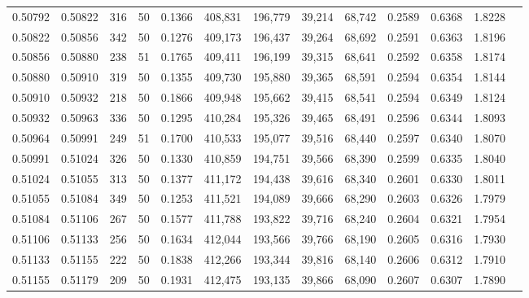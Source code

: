\begin{tabular}{rrrrrrrrrrrrr}
0.50792 & 0.50822 &   316 &  50 &                                     0.1366 & 408,831 & 196,779 &  39,214 &  68,742 & 0.2589 & 0.6368 & 1.8228 \\
0.50822 & 0.50856 &   342 &  50 &                                     0.1276 & 409,173 & 196,437 &  39,264 &  68,692 & 0.2591 & 0.6363 & 1.8196 \\
0.50856 & 0.50880 &   238 &  51 &                                     0.1765 & 409,411 & 196,199 &  39,315 &  68,641 & 0.2592 & 0.6358 & 1.8174 \\
0.50880 & 0.50910 &   319 &  50 &                                     0.1355 & 409,730 & 195,880 &  39,365 &  68,591 & 0.2594 & 0.6354 & 1.8144 \\
0.50910 & 0.50932 &   218 &  50 &                                     0.1866 & 409,948 & 195,662 &  39,415 &  68,541 & 0.2594 & 0.6349 & 1.8124 \\
0.50932 & 0.50963 &   336 &  50 &                                     0.1295 & 410,284 & 195,326 &  39,465 &  68,491 & 0.2596 & 0.6344 & 1.8093 \\
0.50964 & 0.50991 &   249 &  51 &                                     0.1700 & 410,533 & 195,077 &  39,516 &  68,440 & 0.2597 & 0.6340 & 1.8070 \\
0.50991 & 0.51024 &   326 &  50 &                                     0.1330 & 410,859 & 194,751 &  39,566 &  68,390 & 0.2599 & 0.6335 & 1.8040 \\
0.51024 & 0.51055 &   313 &  50 &                                     0.1377 & 411,172 & 194,438 &  39,616 &  68,340 & 0.2601 & 0.6330 & 1.8011 \\
0.51055 & 0.51084 &   349 &  50 &                                     0.1253 & 411,521 & 194,089 &  39,666 &  68,290 & 0.2603 & 0.6326 & 1.7979 \\
0.51084 & 0.51106 &   267 &  50 &                                     0.1577 & 411,788 & 193,822 &  39,716 &  68,240 & 0.2604 & 0.6321 & 1.7954 \\
0.51106 & 0.51133 &   256 &  50 &                                     0.1634 & 412,044 & 193,566 &  39,766 &  68,190 & 0.2605 & 0.6316 & 1.7930 \\
0.51133 & 0.51155 &   222 &  50 &                                     0.1838 & 412,266 & 193,344 &  39,816 &  68,140 & 0.2606 & 0.6312 & 1.7910 \\
0.51155 & 0.51179 &   209 &  50 &                                     0.1931 & 412,475 & 193,135 &  39,866 &  68,090 & 0.2607 & 0.6307 & 1.7890 \\

\end{tabular}
